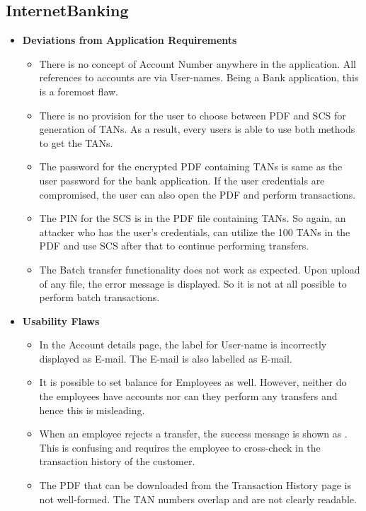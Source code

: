 \subsection{InternetBanking}

\begin{itemize}
    \item \textbf{Deviations from Application Requirements}
        \begin{itemize}
            \item There is no concept of Account Number anywhere in the application. All references to accounts are via User-names. Being a Bank application, this is a foremost flaw.
            \item There is no provision for the user to choose between PDF and SCS for generation of TANs. As a result, every users is able to use both methods to get the TANs.
            \item The password for the encrypted PDF containing TANs is same as the user password for the bank application. If the user credentials are compromised, the user can also open the PDF and perform transactions.
            \item The PIN for the SCS is in the PDF file containing TANs. So again, an attacker who has the user’s credentials, can utilize the 100 TANs in the PDF and use SCS after that to continue performing transfers.
            \item The Batch transfer functionality does not work as expected. Upon upload of any file, the error message  is displayed. So it is not at all possible to perform batch transactions.
        \end{itemize}
    \item \textbf{Usability Flaws}
        \begin{itemize}
            \item In the Account details page, the label for User-name is incorrectly displayed as E-mail. The E-mail is also labelled as E-mail.
            \item It is possible to set balance for Employees as well. However, neither do the employees have accounts nor can they perform any transfers and hence this is misleading.
            \item When an employee rejects a transfer, the success message is shown as . This is confusing and requires the employee to cross-check in the transaction history of the customer.
            \item The PDF that can be downloaded from the Transaction History page is not well-formed. The TAN numbers overlap and are not clearly readable.

\end{itemize}
\end{itemize}
